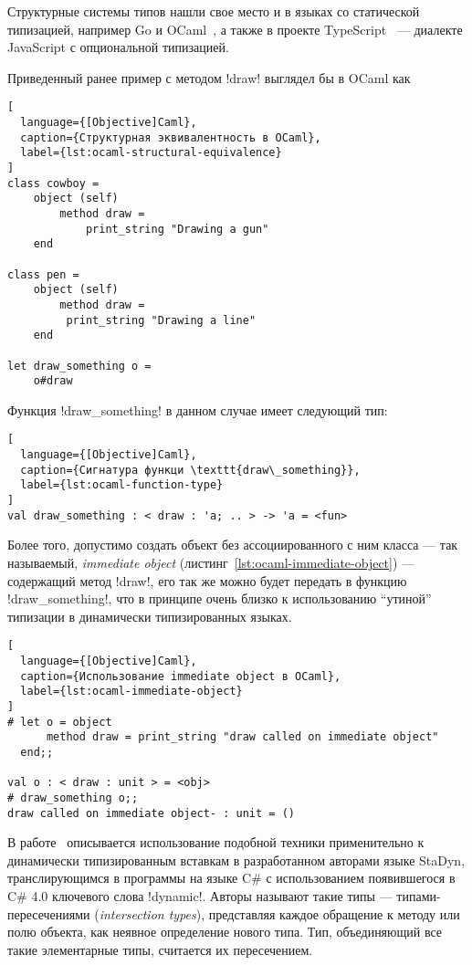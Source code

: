 Структурные системы типов нашли свое место и в языках со статической
типизацией, например Go и OCaml~\cite[с.~33]{Ocaml}, а также в проекте
TypeScript~\cite[]{TypeScript} --- диалекте JavaScript с опциональной
типизацией. 

Приведенный ранее пример с методом !draw! выглядел бы в OCaml как

\newpage
\begin{lstlisting}[
  language={[Objective]Caml},
  caption={Структурная эквивалентность в OCaml},
  label={lst:ocaml-structural-equivalence}
]
class cowboy =
    object (self)
        method draw =
            print_string "Drawing a gun"
    end

class pen = 
    object (self) 
        method draw =
         print_string "Drawing a line"
    end

let draw_something o =
    o#draw

\end{lstlisting}

Функция !draw_something! в данном случае имеет следующий тип:

\begin{lstlisting}[
  language={[Objective]Caml},
  caption={Сигнатура функци \texttt{draw\_something}},
  label={lst:ocaml-function-type}
]
val draw_something : < draw : 'a; .. > -> 'a = <fun>
\end{lstlisting}

Более того, допустимо создать объект без ассоциированного с ним класса --- так
называемый, \emph{immediate object} (листинг~\ref{lst:ocaml-immediate-object})
--- содержащий метод !draw!, его так же можно будет передать в функцию
!draw_something!, что в принципе очень близко к использованию ``утиной'' типизации в
динамически типизированных языках.

\begin{lstlisting}[
  language={[Objective]Caml},
  caption={Использование immediate object в OCaml},
  label={lst:ocaml-immediate-object}
]
# let o = object
      method draw = print_string "draw called on immediate object"
  end;;

val o : < draw : unit > = <obj>
# draw_something o;;
draw called on immediate object- : unit = ()
\end{lstlisting}
\lstset{language=Python}

В работе~\cite{Ortin2011:union} описывается использование подобной техники
применительно к динамически типизированным вставкам в разработанном авторами
языке StaDyn, транслирующимся в программы на языке C\# с использованием
появившегося в C\# 4.0 ключевого слова !dynamic!.  Авторы называют такие
типы --- типами-пересечениями (\emph{intersection types}), представляя каждое
обращение к методу или полю объекта, как неявное определение нового типа. Тип,
объединяющий все такие элементарные типы, считается их пересечением.

